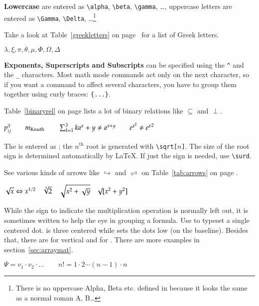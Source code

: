 \textbf{Lowercase } are entered as \verb|\alpha|,
 \verb|\beta|, \verb|\gamma|, \ldots, uppercase letters
are entered as \verb|\Gamma|, \verb|\Delta|, \ldots\footnote{There is no
  uppercase Alpha, Beta etc. defined in \LaTeXe{} because it looks the same as a
  normal roman A, B\ldots{}} 

Take a look at Table~\ref{greekletters} on page~\pageref{greekletters} for a
list of Greek letters.
\begin{example}
$\lambda,\xi,\pi,\theta,
 \mu,\Phi,\Omega,\Delta$
\end{example}


\textbf{Exponents, Superscripts and Subscripts} can be specified using
the \verb|^| and the \verb|_| characters.
Most math mode commands act only on the next character, so if you
want a command to affect several characters, you have to group them
together using curly braces: \verb|{...}|.

Table~\ref{binaryrel} on page \pageref{binaryrel} lists a lot of binary
relations like $\subseteq$ and $\perp$.

\begin{example}
$p^3_{ij} \qquad 
 m_\text{Knuth}\qquad
\sum_{k=1}^3 k \\[5pt]
 a^x+y \neq a^{x+y}\qquad 
 e^{x^2} \neq {e^x}^2$
\end{example}


The \textbf{} is entered as ; the
$n^\text{th}$ root is generated with \verb|\sqrt[|$n$\verb|]|. The size of
the root sign is determined automatically by \LaTeX. If just the sign
is needed, use \verb|\surd|.

See various kinds of arrows like $\hookrightarrow$ and $\rightleftharpoons$ on
Table~\ref{tab:arrows} on page \pageref{tab:arrows}. 
\begin{example}
$\sqrt{x} \Leftrightarrow x^{1/2}
 \quad \sqrt[3]{2}
 \quad \sqrt{x^{2} + \sqrt{y}}
 \quad \surd[x^2 + y^2]$
\end{example}


While the \textbf{} sign to indicate
the multiplication operation is normally left out, it is sometimes written
to help the eye in grouping a formula.
Use  to typeset a single centered dot.  is
three centered \textbf{} while  sets the dots low (on the
baseline). Besides that, there are  for 
vertical and  for . There are more examples in 
section~\ref{sec:arraymat}.
\begin{example}
$\Psi = v_1 \cdot v_2
 \cdot \ldots \qquad 
 n! = 1 \cdot 2 
 \cdots (n-1) \cdot n$
\end{example}

